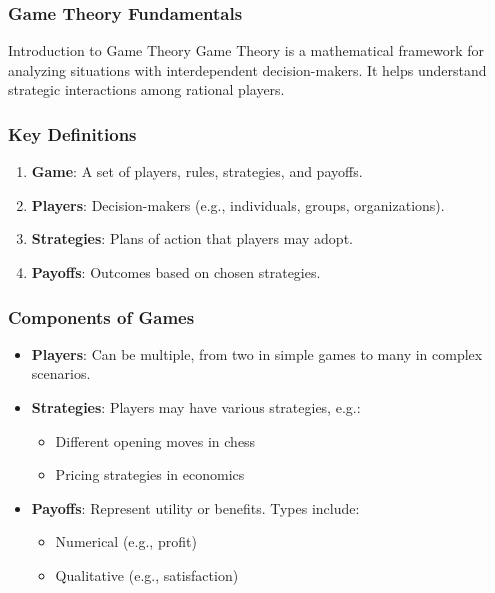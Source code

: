 \documentclass[aspectratio=169]{beamer}
\begin{document}
\begin{frame}[fragile]
    \frametitle{Game Theory Fundamentals}
    \begin{block}{Introduction to Game Theory}
        Game Theory is a mathematical framework for analyzing situations with interdependent decision-makers. It helps understand strategic interactions among rational players.
    \end{block}
\end{frame}

\begin{frame}[fragile]
    \frametitle{Key Definitions}
    \begin{enumerate}
        \item \textbf{Game}: A set of players, rules, strategies, and payoffs.
        \item \textbf{Players}: Decision-makers (e.g., individuals, groups, organizations).
        \item \textbf{Strategies}: Plans of action that players may adopt.
        \item \textbf{Payoffs}: Outcomes based on chosen strategies.
    \end{enumerate}
\end{frame}

\begin{frame}[fragile]
    \frametitle{Components of Games}
    \begin{itemize}
        \item \textbf{Players}: Can be multiple, from two in simple games to many in complex scenarios.
        \item \textbf{Strategies}: Players may have various strategies, e.g.:
            \begin{itemize}
                \item Different opening moves in chess
                \item Pricing strategies in economics
            \end{itemize}
        \item \textbf{Payoffs}: Represent utility or benefits. Types include:
            \begin{itemize}
                \item Numerical (e.g., profit)
                \item Qualitative (e.g., satisfaction)
            \end{itemize}
    \end{itemize}
\end{frame}
\end{document}
